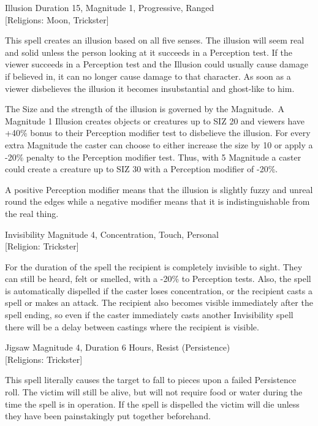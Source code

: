 \begin{rpg-spell}
{Illusion}
{Duration 15, Magnitude 1, Progressive, Ranged\\{[Religions: Moon, Trickster]}}

This spell creates an illusion based on all five senses. The illusion will seem real and solid unless the person looking at it succeeds in a Perception test. If the viewer succeeds in a Perception test and the Illusion could usually cause damage if believed in, it can no longer cause damage to that character. As soon as a viewer disbelieves the illusion it becomes insubstantial and ghost-like to him.

The Size and the strength of the illusion is governed by the Magnitude. A Magnitude 1 Illusion creates objects or creatures up to SIZ 20 and viewers have +40\% bonus to their Perception modifier test to disbelieve the illusion. For every extra Magnitude the caster can choose to either increase the size by 10 or apply a -20\% penalty to the Perception modifier test. Thus, with 5 Magnitude a caster could create a creature up to SIZ 30 with a Perception modifier of -20\%.
    
A positive Perception modifier means that the illusion is slightly fuzzy and unreal round the edges while a negative modifier means that it is indistinguishable from the real thing.
\end{rpg-spell}


\begin{rpg-spell}
{Invisibility}
{Magnitude 4, Concentration, Touch, Personal\\{[Religion: Trickster]}}

For the duration of the spell the recipient is completely invisible to sight. They can still be heard, felt or smelled, with a -20\% to Perception tests. Also, the spell is automatically dispelled if the caster loses concentration, or the recipient casts a spell or makes an attack. The recipient also becomes visible immediately after the spell ending, so even if the caster immediately casts another Invisibility spell there will be a delay between castings where the recipient is visible.
\end{rpg-spell}


\begin{rpg-spell}
{Jigsaw}
{Magnitude 4, Duration 6 Hours, Resist (Persistence)\\{[Religions: Trickster]}}

This spell literally causes the target to fall to pieces upon a failed Persistence roll. The victim will still be alive, but will not require food or water during the time the spell is in operation. If the spell is dispelled the victim will die unless they have been painstakingly put together beforehand. 
\end{rpg-spell}


